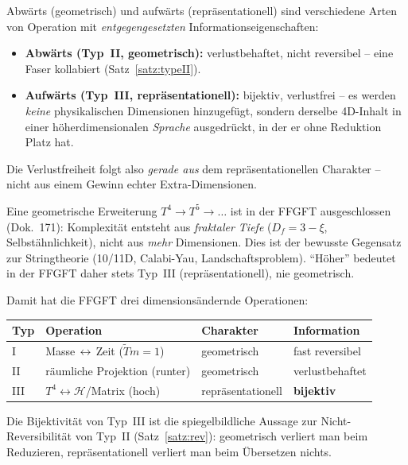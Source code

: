 \begin{important}
Abw\"arts (geometrisch) und aufw\"arts (repr\"asentationell) sind verschiedene
Arten von Operation mit \emph{entgegengesetzten} Informationseigenschaften:
\begin{itemize}
  \item \textbf{Abw\"arts (Typ~II, geometrisch):} verlustbehaftet, nicht
  reversibel -- eine Faser kollabiert (Satz~\ref{satz:typeII}).
  \item \textbf{Aufw\"arts (Typ~III, repr\"asentationell):} bijektiv,
  verlustfrei -- es werden \emph{keine} physikalischen Dimensionen hinzugef\"ugt,
  sondern derselbe 4D-Inhalt in einer h\"oherdimensionalen \emph{Sprache}
  ausgedr\"uckt, in der er ohne Reduktion Platz hat.
\end{itemize}
Die Verlustfreiheit folgt also \emph{gerade aus} dem repr\"asentationellen
Charakter -- nicht aus einem Gewinn echter Extra-Dimensionen.
\end{important}

\begin{remark}
Eine geometrische Erweiterung $T^4 \to T^5 \to \dots$ ist in der FFGFT
ausgeschlossen (Dok.~171): Komplexit\"at entsteht aus \emph{fraktaler Tiefe}
($D_f = 3-\xi$, Selbst\"ahnlichkeit), nicht aus \emph{mehr} Dimensionen. Dies
ist der bewusste Gegensatz zur Stringtheorie (10/11D, Calabi-Yau,
Landschaftsproblem). ``H\"oher'' bedeutet in der FFGFT daher stets Typ~III
(repr\"asentationell), nie geometrisch.
\end{remark}

Damit hat die FFGFT drei dimensions\"andernde Operationen:

\begin{center}
\begin{tabular}{llll}
\hline
\textbf{Typ} & \textbf{Operation} & \textbf{Charakter} & \textbf{Information} \\
\hline
I & Masse\,$\leftrightarrow$\,Zeit ($\tilde T m=1$) & geometrisch & fast reversibel \\
II & r\"aumliche Projektion (runter) & geometrisch & verlustbehaftet \\
III & $T^4\leftrightarrow\mathcal{H}$/Matrix (hoch) & repr\"asentationell & \textbf{bijektiv} \\
\hline
\end{tabular}
\end{center}

\noindent
Die Bijektivit\"at von Typ~III ist die spiegelbildliche Aussage zur
Nicht-Reversibilit\"at von Typ~II (Satz~\ref{satz:rev}): geometrisch verliert
man beim Reduzieren, repr\"asentationell verliert man beim \"Ubersetzen nichts.

